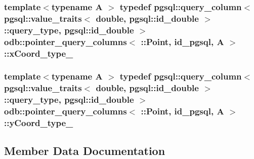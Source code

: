\subsubsection[{x\+Coord\+\_\+type\+\_\+}]{\setlength{\rightskip}{0pt plus 5cm}template$<$typename A $>$ typedef pgsql\+::query\+\_\+column$<$ pgsql\+::value\+\_\+traits$<$ double, pgsql\+::id\+\_\+double $>$\+::query\+\_\+type, pgsql\+::id\+\_\+double $>$ odb\+::pointer\+\_\+query\+\_\+columns$<$ \+::{\bf Point}, id\+\_\+pgsql, A $>$\+::{\bf x\+Coord\+\_\+type\+\_\+}}\label{structodb_1_1pointer__query__columns_3_01_1_1_point_00_01id__pgsql_00_01_a_01_4_a5e9f6d30d27a826d7ad60ce86c6fc70d}
\hypertarget{structodb_1_1pointer__query__columns_3_01_1_1_point_00_01id__pgsql_00_01_a_01_4_ade880c49b2a6928423bad8f7207e6fed}{}
\subsubsection[{y\+Coord\+\_\+type\+\_\+}]{\setlength{\rightskip}{0pt plus 5cm}template$<$typename A $>$ typedef pgsql\+::query\+\_\+column$<$ pgsql\+::value\+\_\+traits$<$ double, pgsql\+::id\+\_\+double $>$\+::query\+\_\+type, pgsql\+::id\+\_\+double $>$ odb\+::pointer\+\_\+query\+\_\+columns$<$ \+::{\bf Point}, id\+\_\+pgsql, A $>$\+::{\bf y\+Coord\+\_\+type\+\_\+}}\label{structodb_1_1pointer__query__columns_3_01_1_1_point_00_01id__pgsql_00_01_a_01_4_ade880c49b2a6928423bad8f7207e6fed}


\subsection{Member Data Documentation}
\hypertarget{structodb_1_1pointer__query__columns_3_01_1_1_point_00_01id__pgsql_00_01_a_01_4_a85f8c0610cc1b9285ad533bea4506840}{}
